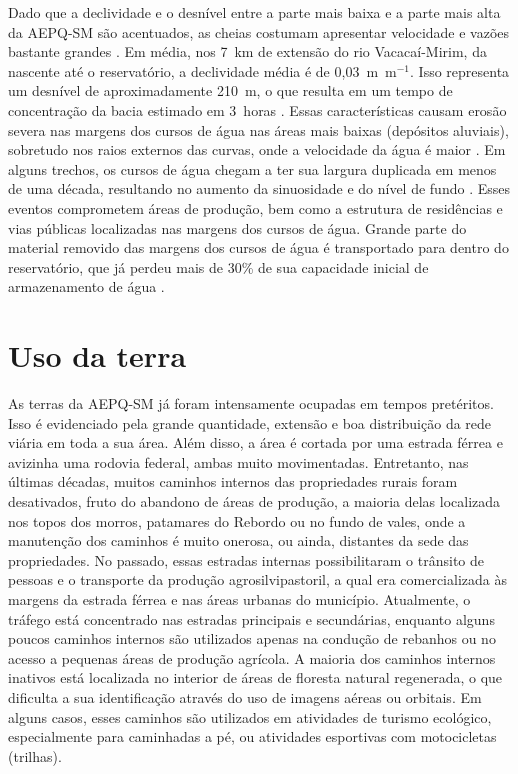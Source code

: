 Dado que a declividade e o desnível entre a parte mais baixa e a parte mais alta da AEPQ-SM são acentuados, as cheias costumam apresentar velocidade e vazões bastante grandes \cite{PaivaEtAl2001, SutiliEtAl2009}. Em média, nos 7~km de extensão do rio Vacacaí-Mirim, da nascente até o reservatório, a declividade média é de 0,03~m~m$^{-1}$. Isso representa um desnível de aproximadamente 210~m, o que resulta em um tempo de concentração da bacia estimado em 3~horas \cite{PaivaEtAl2001}. Essas características causam erosão severa nas margens dos cursos de água nas áreas mais baixas (depósitos aluviais), sobretudo nos raios externos das curvas, onde a velocidade da água é maior \cite{SutiliEtAl2009}. Em alguns trechos, os cursos de água chegam a ter sua largura duplicada em menos de uma década, resultando no aumento da sinuosidade e do nível de fundo \cite{PaivaEtAl2001}. Esses eventos comprometem áreas de produção, bem como a estrutura de residências e vias públicas localizadas nas margens dos cursos de água. Grande parte do material removido das margens dos cursos de água é transportado para dentro do reservatório, que já perdeu mais de 30\% de sua capacidade inicial de armazenamento de água \cite{DillEtAl2004}.

\section{Uso da terra}

As terras da AEPQ-SM já foram intensamente ocupadas em tempos pretéritos. Isso é evidenciado pela grande quantidade, extensão e boa distribuição da rede viária em toda a sua área. Além disso, a área é cortada por uma estrada férrea e avizinha uma rodovia federal, ambas muito movimentadas. Entretanto, nas últimas décadas, muitos caminhos internos das propriedades rurais foram desativados, fruto do abandono de áreas de produção, a maioria delas localizada nos topos dos morros, patamares do Rebordo ou no fundo de vales, onde a manutenção dos caminhos é muito onerosa, ou ainda, distantes da sede das propriedades. No passado, essas estradas internas possibilitaram o trânsito de pessoas e o transporte da produção agrosilvipastoril, a qual era comercializada às margens da estrada férrea e nas áreas urbanas do município. Atualmente, o tráfego está concentrado nas estradas principais e secundárias, enquanto alguns poucos caminhos internos são utilizados apenas na condução de rebanhos ou no acesso a pequenas áreas de produção agrícola. A maioria dos caminhos internos inativos está localizada no interior de áreas de floresta natural regenerada, o que dificulta a sua identificação através do uso de imagens aéreas ou orbitais. Em alguns casos, esses caminhos são utilizados em atividades de turismo ecológico, especialmente para caminhadas a pé, ou atividades esportivas com motocicletas (trilhas).

